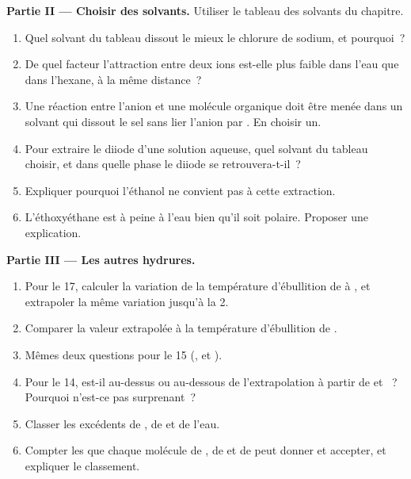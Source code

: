 \begin{problem}
\medskip
\noindent\textbf{Partie II --- Choisir des solvants.}
Utiliser le tableau des solvants du chapitre.
\begin{enumerate}[resume]
  \item Quel solvant du tableau dissout le mieux le chlorure de sodium,
        et pourquoi~?
  \item De quel facteur l'attraction entre deux ions est-elle plus faible
        dans l'eau que dans l'hexane, à la même distance~?
  \item Une réaction entre l'anion  et une molécule organique
        doit être menée dans un solvant qui dissout le sel sans lier
        l'anion par . En choisir un.
  \item Pour extraire le diiode d'une solution aqueuse, quel solvant du
        tableau choisir, et dans quelle phase le diiode se
        retrouvera-t-il~?
  \item Expliquer pourquoi l'éthanol ne convient pas à cette extraction.
  \item L'éthoxyéthane est à peine  à l'eau bien qu'il soit
        polaire. Proposer une explication.
\end{enumerate}

\medskip
\noindent\textbf{Partie III --- Les autres hydrures.}
\begin{enumerate}[resume]
  \item Pour le  17, calculer la variation de la température
        d'ébullition de  à , et extrapoler la même
        variation jusqu'à la  2.
  \item Comparer la valeur extrapolée à la température d'ébullition de
        .
  \item Mêmes deux questions pour le  15 (,  et
        ).
  \item Pour le  14,  est-il au-dessus ou au-dessous de
        l'extrapolation à partir de  et ~? Pourquoi
        n'est-ce pas surprenant~?
  \item Classer les excédents de , de  et de l'eau.
  \item Compter les  que chaque molécule de ,
        de  et de  peut donner et accepter, et expliquer
        le classement.
\end{enumerate}


\end{problem}

